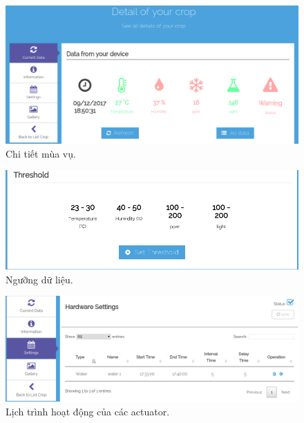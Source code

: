 \documentclass[a4paper,12pt,oneside]{article}
\begin{document}
\begin{center}
\begin{figure}[H]
\centering
\includegraphics[scale=.4]{hinh/web_crop_detail.png}
\caption{Chi tiết mùa vụ.}
\end{figure}

\begin{figure}[H]
\centering
\includegraphics[scale=.5]{hinh/web_threshold.png}
\caption{Ngưỡng dữ liệu.}
\end{figure}

\begin{figure}[H]
\centering
\includegraphics[scale=.5]{hinh/web_schedule.png}
\caption{Lịch trình hoạt động của các actuator.}
\end{figure}


\end{center}
\end{document}
